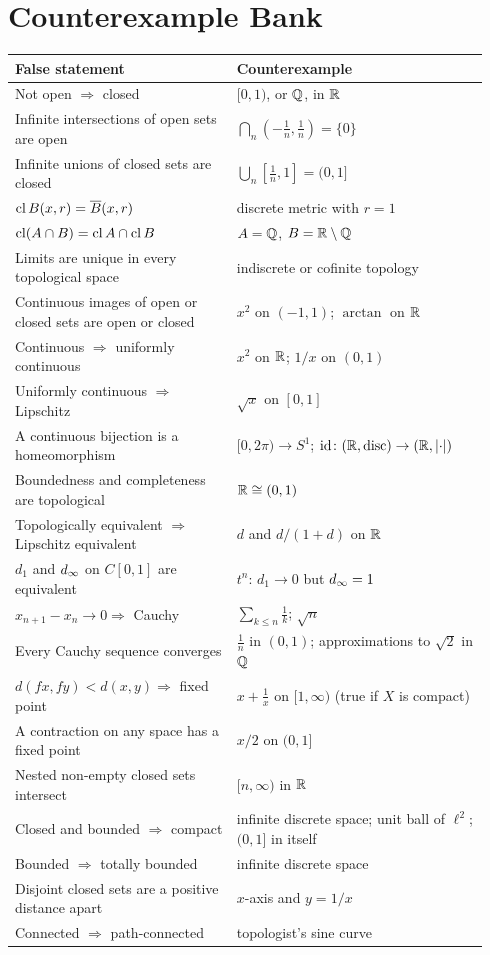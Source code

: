 \chapter{Counterexample Bank}\label{app:counter}
\begin{center}
\renewcommand{\arraystretch}{1.3}
\begin{longtable}{@{}p{0.44\linewidth}p{0.5\linewidth}@{}}
\toprule
\textbf{False statement} & \textbf{Counterexample}\\
\midrule
\endhead
Not open $\Rightarrow$ closed & $[0,1)$, or $\mathbb{Q}$, in $\mathbb{R}$\\
Infinite intersections of open sets are open & $\bigcap_n(-\frac1n,\frac1n)=\{0\}$\\
Infinite unions of closed sets are closed & $\bigcup_n[\frac1n,1]=(0,1]$\\
$\operatorname{cl}B(x,r)=\overline{B}(x,r)$ & discrete metric with $r=1$\\
$\operatorname{cl}(A\cap B)=\operatorname{cl} A\cap\operatorname{cl} B$ & $A=\mathbb{Q}$, $B=\mathbb{R}\setminus\mathbb{Q}$\\
Limits are unique in every topological space & indiscrete or cofinite topology\\
Continuous images of open or closed sets are open or closed & $x^2$ on $(-1,1)$; $\arctan$ on $\mathbb{R}$\\
Continuous $\Rightarrow$ uniformly continuous & $x^2$ on $\mathbb{R}$; $1/x$ on $(0,1)$\\
Uniformly continuous $\Rightarrow$ Lipschitz & $\sqrt x$ on $[0,1]$\\
A continuous bijection is a homeomorphism & $[0,2\pi)\to S^1$; $\mathrm{id}\colon(\mathbb{R},\text{disc})\to(\mathbb{R},\left\lvert \cdot\right\rvert)$\\
Boundedness and completeness are topological & $\mathbb{R}\cong(0,1)$\\
Topologically equivalent $\Rightarrow$ Lipschitz equivalent & $d$ and $d/(1+d)$ on $\mathbb{R}$\\
$d_1$ and $d_\infty$ on $C[0,1]$ are equivalent & $t^n$: $d_1\to0$ but $d_\infty=1$\\
$x_{n+1}-x_n\to0\Rightarrow$ Cauchy & $\sum_{k\le n}\frac1k$; $\sqrt n$\\
Every Cauchy sequence converges & $\frac1n$ in $(0,1)$; approximations to $\sqrt2$ in $\mathbb{Q}$\\
$d(fx,fy)<d(x,y)\Rightarrow$ fixed point & $x+\frac1x$ on $[1,\infty)$ (true if $X$ is compact)\\
A contraction on any space has a fixed point & $x/2$ on $(0,1]$\\
Nested non-empty closed sets intersect & $[n,\infty)$ in $\mathbb{R}$\\
Closed and bounded $\Rightarrow$ compact & infinite discrete space; unit ball of $\ell^2$; $(0,1]$ in itself\\
Bounded $\Rightarrow$ totally bounded & infinite discrete space\\
Disjoint closed sets are a positive distance apart & $x$-axis and $y=1/x$\\
Connected $\Rightarrow$ path-connected & topologist's sine curve\\
\bottomrule
\end{longtable}
\end{center}

